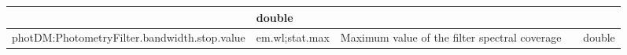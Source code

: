 \documentclass[11pt,a4paper]{ivoa}
\begin{document}
\begin{appendices}
\begin{table}[H]
\begin{adjustbox}{angle=90}
\begin{tabular}{p{5in}p{0.87in}p{2in}p{0.4in}p{0.25in}}
\multicolumn{1}{p{0.74in}}{} &
\multicolumn{1}{p{0.35in}}{{\fontsize{8pt}{8pt}\selectfont double}} \\
\hline
\multicolumn{1}{p{5in}}{{\fontsize{8pt}{8pt}\selectfont photDM:PhotometryFilter.bandwidth.stop.value}} &
\multicolumn{1}{p{0.87in}}{{\fontsize{8pt}{8pt}\selectfont em.wl;stat.max}} &
\multicolumn{1}{p{2in}}{{\fontsize{8pt}{8pt}\selectfont Maximum value of the filter spectral coverage}} &
\multicolumn{1}{p{0.74in}}{} &
\multicolumn{1}{p{0.35in}}{{\fontsize{8pt}{8pt}\selectfont double}} \\
\hline
\end{tabular}
\end{adjustbox}
 \end{table}





\newpage




\end{appendices}
\end{document}
